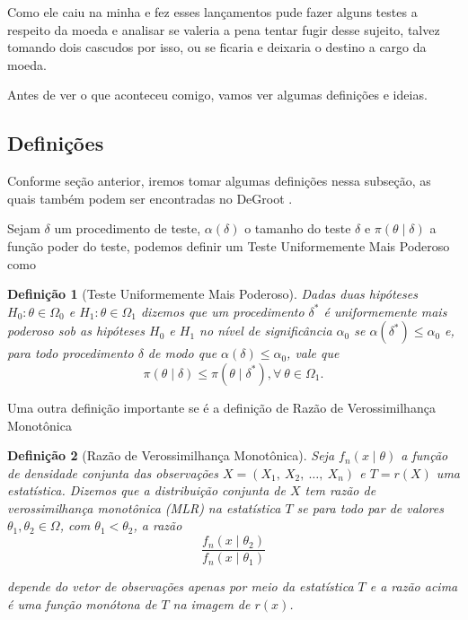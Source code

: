 \documentclass{article}
\newtheorem{definition}{Definição}
\begin{document}
Como ele caiu na minha e fez esses lançamentos pude fazer alguns testes a respeito da moeda e analisar se valeria a pena tentar fugir desse sujeito, talvez tomando dois cascudos por isso, ou se ficaria e deixaria o destino a cargo da moeda.

Antes de ver o que aconteceu comigo, vamos ver algumas definições e ideias.

\subsection*{Definições}

Conforme seção anterior, iremos tomar algumas definições nessa subseção, as quais também podem ser encontradas no DeGroot \cite{degroot}.

Sejam $\delta$ um procedimento de teste, $\alpha(\delta)$ o tamanho do teste $\delta$ e $\pi(\theta \mid \delta)$ a função poder do teste, podemos definir um Teste Uniformemente Mais Poderoso como
\begin{definition}[Teste Uniformemente Mais Poderoso]
    Dadas duas hipóteses $H_0 : \theta \in \Omega_0$ e $H_1 : \theta \in \Omega_1$ dizemos que um procedimento $\delta^*$ é uniformemente mais poderoso sob as hipóteses $H_0$ e $H_1$ no nível de significância $\alpha_0$ se $\alpha(\delta^*) \leq \alpha_0$ e, para todo procedimento $\delta$ de modo que $\alpha(\delta) \leq \alpha_0$, vale que
    \[\pi(\theta \mid \delta) \leq \pi(\theta \mid \delta^*), \forall ~\theta \in \Omega_1.\]
\end{definition}

Uma outra definição importante se é a definição de Razão de Verossimilhança Monotônica
\begin{definition}[Razão de Verossimilhança Monotônica]
    Seja $f_n(x \mid \theta)$ a função de densidade conjunta das observações $X = \left(X_1, ~X_2, ~\dots, ~X_n\right)$ e $T = r(X)$ uma estatística. Dizemos que a distribuição conjunta de $X$ tem razão de verossimilhança monotônica (MLR) na estatística $T$ se para todo par de valores $\theta_1, \theta_2 \in \Omega$, com $\theta_1 < \theta_2$, a razão
    \begin{equation}
        \label{MLR}
        \dfrac{f_n(x \mid \theta_2)}{f_n(x \mid \theta_1)}
    \end{equation}
    
    \noindent depende do vetor de observações apenas por meio da estatística $T$ e a razão acima é uma função monótona de $T$ na imagem de $r(x)$.
\end{definition}
\end{document}
